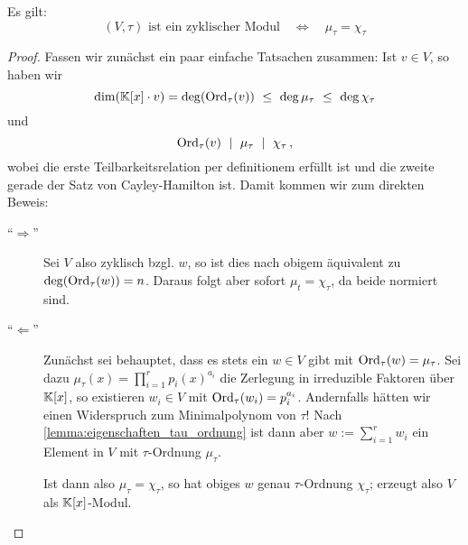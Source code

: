 \begin{satz}
  Es gilt:
  \[ (V,\tau) \text{ ist ein zyklischer Modul} \quad\Leftrightarrow\quad
    \mu_\tau = \chi_\tau\]
\end{satz}
\begin{proof}
  Fassen wir zunächst ein paar einfache Tatsachen zusammen:
  Ist $v \in V$, so haben wir 
  \[ \dim(\mathbb{K}[x]\cdot v) = \deg( \operatorname{Ord}_\tau(v) ) \ \leq\  
    \deg\mu_\tau \ \leq\  \deg \chi_\tau \]
  und 
  \[ \operatorname{Ord}_\tau (v) \ \mid\  \mu_\tau \ \mid\  \chi_\tau \,,\]
  wobei die erste Teilbarkeitsrelation per definitionem erfüllt ist und die
  zweite gerade der Satz von Cayley-Hamilton ist.
  Damit kommen wir zum direkten Beweis:
  \begin{description}
    \item["`$\Rightarrow$"'] Sei $V$ also zyklisch bzgl. $w$, so ist dies nach
      obigem äquivalent zu $\deg(\operatorname{Ord}_\tau(w)) = n$. Daraus folgt aber sofort
      $\mu_t = \chi_\tau$, da beide normiert sind.
    \item["`$\Leftarrow$"'] Zunächst sei behauptet, dass es stets ein 
      $w \in V$ gibt mit $\operatorname{Ord}_\tau(w) = \mu_\tau$. Sei dazu 
      $\mu_\tau(x) = \prod_{i=1}^r p_i(x)^{a_i}$ die Zerlegung in irreduzible
      Faktoren über $\mathbb{K}[x]$, so existieren $w_i \in V$ mit
      $\operatorname{Ord}_\tau(w_i) = p_i^{a_i}$. Andernfalls hätten wir einen Widerspruch 
      zum Minimalpolynom von $\tau$!
      Nach \autoref{lemma:eigenschaften_tau_ordnung} ist dann aber 
      $w := \sum_{i=1}^r w_i$ ein Element in $V$ mit $\tau$-Ordnung $\mu_\tau$.

      Ist dann also $\mu_\tau = \chi_\tau$, so hat obiges $w$ genau
      $\tau$-Ordnung $\chi_\tau$; erzeugt also $V$ als $\mathbb{K}[x]$-Modul.
  \end{description}
\end{proof}


